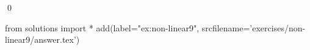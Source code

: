 
\begin{ex} 
  \label{ex:non-linear9}
  
  \qed
\end{ex} 
\begin{python0}
from solutions import *
add(label="ex:non-linear9",
    srcfilename='exercises/non-linear9/answer.tex') 
\end{python0}
